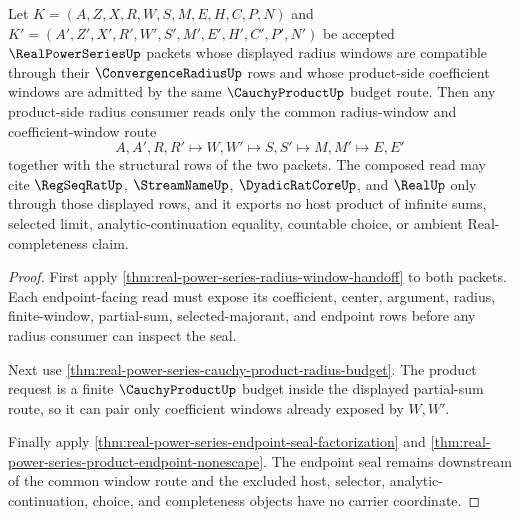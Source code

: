 \begin{theorem}
\label{thm:real-power-series-radius-composition}
Let $K=(A,Z,X,R,W,S,M,E,H,C,P,N)$ and $K'=(A',Z',X',R',W',S',M',E',H',C',P',N')$ be accepted $\RealPowerSeriesUp$ packets whose displayed radius windows are compatible through their $\ConvergenceRadiusUp$ rows and whose product-side coefficient windows are admitted by the same $\CauchyProductUp$ budget route. Then any product-side radius consumer reads only the common radius-window and coefficient-window route
$$
A,A',R,R'\longmapsto W,W'\longmapsto S,S'\longmapsto M,M'\longmapsto E,E'
$$
together with the structural rows of the two packets. The composed read may cite $\RegSeqRatUp$, $\StreamNameUp$, $\DyadicRatCoreUp$, and $\RealUp$ only through those displayed rows, and it exports no host product of infinite sums, selected limit, analytic-continuation equality, countable choice, or ambient Real-completeness claim.
\end{theorem}
\begin{proof}
First apply \autoref{thm:real-power-series-radius-window-handoff} to both packets. Each endpoint-facing read must expose its coefficient, center, argument, radius, finite-window, partial-sum, selected-majorant, and endpoint rows before any radius consumer can inspect the seal.

Next use \autoref{thm:real-power-series-cauchy-product-radius-budget}. The product request is a finite $\CauchyProductUp$ budget inside the displayed partial-sum route, so it can pair only coefficient windows already exposed by $W,W'$.

Finally apply \autoref{thm:real-power-series-endpoint-seal-factorization} and \autoref{thm:real-power-series-product-endpoint-nonescape}. The endpoint seal remains downstream of the common window route and the excluded host, selector, analytic-continuation, choice, and completeness objects have no carrier coordinate.
\end{proof}

